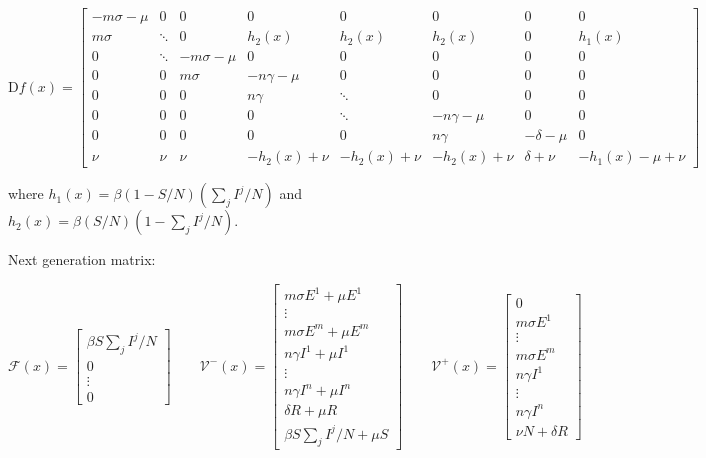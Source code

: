\documentclass[fleqn]{article}
\begin{document}
\begin{equation*}
\mathrm{D}f(x) =
\begin{bmatrix}
-m\sigma-\mu &      0 &            0 &             0 &             0 &             0 &           0 &                 0 \\
 m\sigma     & \ddots &            0 &      h_{2}(x) &      h_{2}(x) &      h_{2}(x) &           0 &          h_{1}(x) \\
           0 & \ddots & -m\sigma-\mu &             0 &             0 &             0 &           0 &                 0 \\
           0 &      0 &  m\sigma     &  -n\gamma-\mu &             0 &             0 &           0 &                 0 \\
           0 &      0 &            0 &   n\gamma     &        \ddots &             0 &           0 &                 0 \\
           0 &      0 &            0 &             0 &        \ddots &  -n\gamma-\mu &           0 &                 0 \\
           0 &      0 &            0 &             0 &             0 &   n\gamma     & -\delta-\mu &                 0 \\
         \nu &    \nu &          \nu & -h_{2}(x)+\nu & -h_{2}(x)+\nu & -h_{2}(x)+\nu &  \delta+\nu & -h_{1}(x)-\mu+\nu
\end{bmatrix}
\end{equation*}

where
$h_{1}(x) = \beta (1 - S/N) (\sum_{j} I^{j}/N)$
and
$h_{2}(x) = \beta (S/N) (1 - \sum_{j} I^{j}/N)$.

Next generation matrix:

\begin{equation*}
\mathcal{F}(x) =
\begin{bmatrix}
\beta S \sum_{j} I^{j} / N \\ 0 \\ \vdots \\ 0
\end{bmatrix}
\qquad
\mathcal{V}^{-}(x) =
\begin{bmatrix}
m \sigma E^{1} + \mu E^{1} \\ \vdots \\ m \sigma E^{m} + \mu E^{m} \\ n \gamma I^{1} + \mu I^{1} \\ \vdots \\ n \gamma I^{n} + \mu I^{n} \\ \delta R + \mu R \\ \beta S \sum_{j} I^{j} / N + \mu S
\end{bmatrix}
\qquad
\mathcal{V}^{+}(x) =
\begin{bmatrix}
0 \\ m \sigma E^{1} \\ \vdots \\ m \sigma E^{m} \\ n \gamma I^{1} \\ \vdots \\ n \gamma I^{n} \\ \nu N + \delta R
\end{bmatrix}
\end{equation*}
\end{document}
